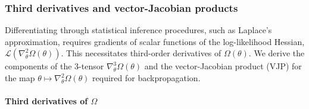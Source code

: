 \documentclass{article}
\begin{document}
\subsubsection{Third derivatives and vector-Jacobian products}

Differentiating through statistical inference procedures, such as Laplace's approximation, requires gradients of scalar functions of the log-likelihood Hessian, $\mathcal{L}(\nabla_\theta^2 \Omega(\theta))$.
This necessitates third-order derivatives of $\Omega(\theta)$.
We derive the components of the 3-tensor $\nabla_\theta^3 \Omega(\theta)$ and the vector-Jacobian product (VJP) for the map $\theta \mapsto \nabla_\theta^2 \Omega(\theta)$ required for backpropagation.

\paragraph{Third derivatives of $\Omega$}
\end{document}

